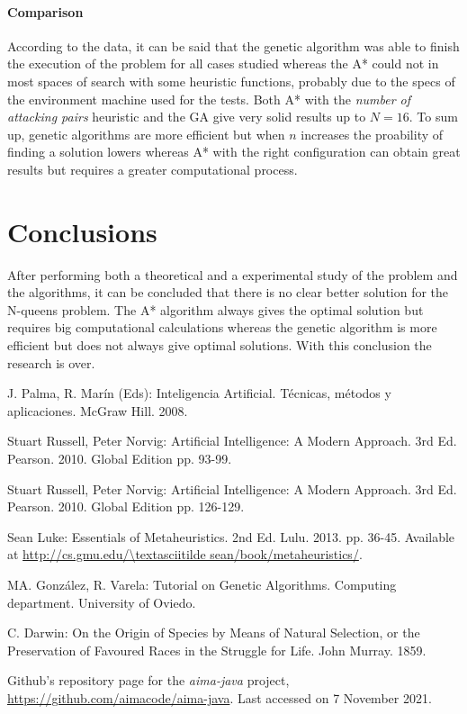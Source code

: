 \documentclass[]{llncs}
\begin{document}
\paragraph{Comparison}
According to the data, it can be said that the genetic algorithm was able to finish the execution of the problem for all cases studied whereas the A* could not in most spaces of search with some heuristic functions, probably due to the specs of the environment machine used for the tests. Both A* with the \textit{number of attacking pairs} heuristic and the GA give very solid results up to $N=16$. To sum up, genetic algorithms are more efficient but when $n$ increases the proability of finding a solution lowers whereas A* with the right configuration can obtain great results but requires a greater computational process.

\section{Conclusions}\label{conclusions}
After performing both a theoretical and a experimental study of the problem and the algorithms, it can be concluded that there is no clear better solution for the N-queens problem. The A* algorithm always gives the optimal solution but requires big computational calculations whereas the genetic algorithm is more efficient but does not always give optimal solutions. With this conclusion the research is over.
\begin{thebibliography}{8}
        J. Palma, R. Marín (Eds): Inteligencia Artificial. Técnicas, métodos y aplicaciones. McGraw Hill. 2008.

        Stuart Russell, Peter Norvig: Artificial Intelligence: A Modern Approach. 3rd Ed. Pearson. 2010. Global Edition pp. 93-99.

        Stuart Russell, Peter Norvig: Artificial Intelligence: A Modern Approach. 3rd Ed. Pearson. 2010. Global Edition pp. 126-129.

        Sean Luke: Essentials of Metaheuristics. 2nd Ed. Lulu. 2013. pp. 36-45. Available at \url{http://cs.gmu.edu/\textasciitilde sean/book/metaheuristics/}.

        MA. González, R. Varela: Tutorial on Genetic Algorithms. Computing department. University of Oviedo.

        C. Darwin: On the Origin of Species by Means of Natural Selection, or the Preservation of Favoured Races in the Struggle for Life. John Murray. 1859.

        Github's repository page for the \textit{aima-java} project, \url{https://github.com/aimacode/aima-java}. Last accessed on 7 November 2021.
\end{thebibliography}
\end{document}
